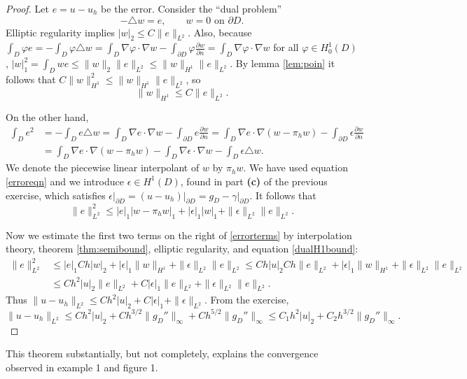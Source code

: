 \documentclass[12pt]{amsart}
\theoremstyle{definition}
\newcommand{\ddn}[1]{\frac{\partial #1}{\partial n}}
\newcommand{\eps}{\epsilon}
\newcommand{\grad}{\nabla}
\newcommand{\lap}{\triangle}
\newcommand{\vf}{\varphi}
\begin{document}
\begin{proof}  Let $e=u-u_h$ be the error.  Consider the ``dual problem'' 
    $$-\lap w = e, \qquad w=0 \text{ on } \partial D.$$
Elliptic regularity implies $|w|_2 \le C \|e\|_{L^2}$.  Also, because $\int_D \vf e = -\int_D \vf \lap w = \int_D \grad \vf\cdot \grad w - \int_{\partial D} \vf \ddn{w} = \int_D \grad \vf \cdot \grad w$ for all $\vf\in H_0^1(D)$, $|w|_1^2 = \int_D w e \le \|w\|_2 \|e\|_{L^2} \le \|w\|_{H^1} \|e\|_{L^2}$.  By lemma \ref{lem:poin} it follows that $C\|w\|_{H^1}^2 \le \|w\|_{H^1} \|e\|_{L^2}$, so 
\begin{equation}\label{dualH1bound}
\|w\|_{H^1} \le C \|e\|_{L^2}.
\end{equation}

On the other hand,
\begin{align*}
\int_D e^2 &= -\int_D e\lap w = \int_D \grad e\cdot \grad w - \int_{\partial D} e \ddn{w} = \int_D \grad e\cdot \grad (w-\pi_h w) - \int_{\partial D} \eps \ddn{w} \\
    &= \int_D \grad e\cdot \grad (w-\pi_h w) - \int_D \grad \eps \cdot \grad w - \int_D \eps \lap w.
\end{align*}
We denote the piecewise linear interpolant of $w$ by $\pi_hw$.  We have used equation \eqref{erroreqn} and we introduce $\eps\in H^1(D)$, found in part \textbf{(c)} of the previous exercise, which satisfies $\eps\big|_{\partial D} = (u-u_h)\big|_{\partial D} = g_D - \gamma\big|_{\partial D}$.  It follows that
\begin{equation}\label{errorterms}
    \|e\|_{L^2}^2 \le |e|_1 |w-\pi_h w|_1 + |\eps|_1 |w|_1 + \|\eps\|_{L^2} \|e\|_{L^2}.
\end{equation}

Now we estimate the first two terms on the right of \eqref{errorterms} by interpolation theory, theorem \ref{thm:semibound}, elliptic regularity, and equation \eqref{dualH1bound}:
\begin{align*}
\|e\|_{L^2}^2 &\le |e|_1 C h|w|_2 + |\eps|_1 \|w\|_{H^1} + \|\eps\|_{L^2} \|e\|_{L^2} \le C h |u|_2 C h \|e\|_{L^2} + |\eps|_1 \|w\|_{H^1} + \|\eps\|_{L^2} \|e\|_{L^2} \\
    &\le C h^2 |u|_2 \|e\|_{L^2} + C |\eps|_1 \|e\|_{L^2} + \|\eps\|_{L^2} \|e\|_{L^2}.
\end{align*}
Thus $\|u-u_h\|_{L^2} \le C h^2 |u|_2 + C |\eps|_1 + \|\eps\|_{L^2}$.  From the exercise,
    $$\|u-u_h\|_{L^2} \le C h^2 |u|_2 + C h^{3/2} \|g_D''\|_\infty + C h^{5/2} \|g_D''\|_\infty \le C_1 h^2 |u|_2 + C_2 h^{3/2} \|g_D''\|_\infty.$$\end{proof}

This theorem substantially, but not completely, explains the convergence observed in example 1 and figure 1.




\end{document}
